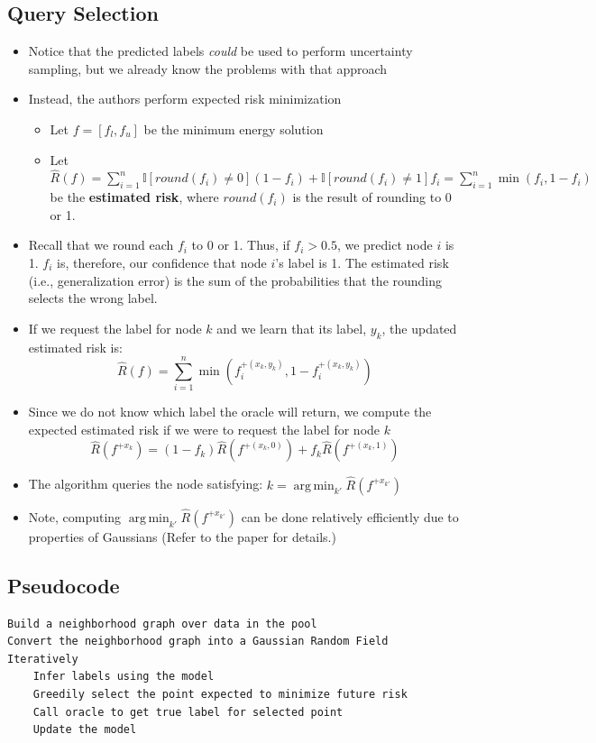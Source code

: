 \documentclass[10pt]{article}
\DeclareMathOperator*{\argmin}{arg\,min}
\begin{document}
\subsection*{Query Selection}
\begin{itemize}
	\item Notice that the predicted labels \textit{could} be used to perform uncertainty sampling, but we already know the problems with that approach
	\item Instead, the authors perform expected risk minimization
	\begin{itemize}
	    \item Let $f = [f_l, f_u]$ be the minimum energy solution
	    \item Let $\hat{R}(f) = \sum_{i = 1}^n \mathbb{I}[round (f_i) \neq 0](1 - f_i) + \mathbb{I}[round(f_i) \neq 1] f_i = \sum_{i = 1}^n \min(f_i, 1 - f_i)$ be the \textbf{estimated risk}, where $round(f_i)$ is the result of rounding to 0 or 1.
    \end{itemize}
    \item Recall that we round each $f_i$ to 0 or 1.  Thus, if $f_i > 0.5$, we predict node $i$ is 1.  $f_i$ is, therefore, our confidence that node $i$'s label is 1.  The estimated risk (i.e., generalization error) is the sum of the probabilities that the rounding selects the wrong label.
    \item If we request the label for node $k$ and we learn that its label, $y_k$, the updated estimated risk is:
    \[\hat{R}(f) = \sum_{i = 1}^n \min \left(f_i^{+(x_k, y_k)}, 1 - f_i^{+(x_k, y_k)}\right)\]
    \item Since we do not know which label the oracle will return, we compute the expected estimated risk if we were to request the label for node $k$
    \[\hat{R}(f^{+x_k}) = (1 - f_k) \hat{R} (f^{+(x_k, 0)}) + f_k \hat{R}(f^{+(x_k, 1)})\]
    \item The algorithm queries the node satisfying: $k = \argmin_{k'} \hat{R} (f^{+x_{k'}})$
    \item Note, computing $\argmin_{k'} \hat{R}(f^{+x_{k'}})$ can be done relatively efficiently due to properties of Gaussians (Refer to the paper for details.)
\end{itemize}

\subsection*{Pseudocode}
\begin{verbatim}
Build a neighborhood graph over data in the pool
Convert the neighborhood graph into a Gaussian Random Field 
Iteratively
    Infer labels using the model
    Greedily select the point expected to minimize future risk
    Call oracle to get true label for selected point
    Update the model
\end{verbatim}
\end{document}
